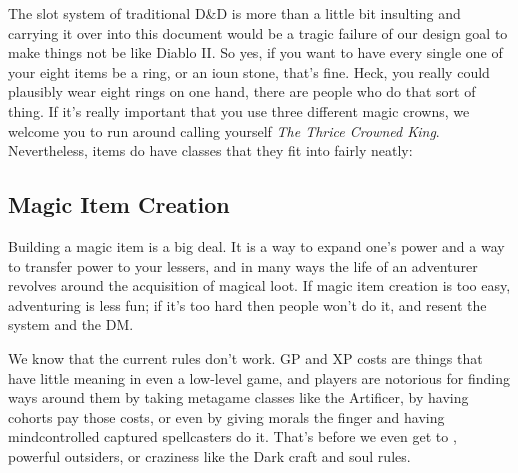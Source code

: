 The slot system of traditional D\&D is more than a little bit insulting and carrying it over into this document would be a tragic failure of our design goal to make things not be like Diablo II. So yes, if you want to have every single one of your eight items be a ring, or an ioun stone, that's fine. Heck, you really could plausibly wear eight rings on one hand, there are people who do that sort of thing. If it's really important that you use three different magic crowns, we welcome you to run around calling yourself \textit{The Thrice Crowned King}. Nevertheless, items do have classes that they fit into fairly neatly:

\begin{enumerate}
\end{enumerate}

\subsection{Magic Item Creation}

Building a magic item is a big deal. It is a way to expand one's power and a way to transfer power to your lessers, and in many ways the life of an adventurer revolves around the acquisition of magical loot. If magic item creation is too easy, adventuring is less fun; if it's too hard then people won't do it, and resent the system and the DM.

We know that the current rules don't work. GP and XP costs are things that have little meaning in even a low-level game, and players are notorious for finding ways around them by taking metagame classes like the Artificer, by having cohorts pay those costs, or even by giving morals the finger and having mindcontrolled captured spellcasters do it. That's before we even get to , powerful outsiders, or craziness like the Dark craft and soul rules.

